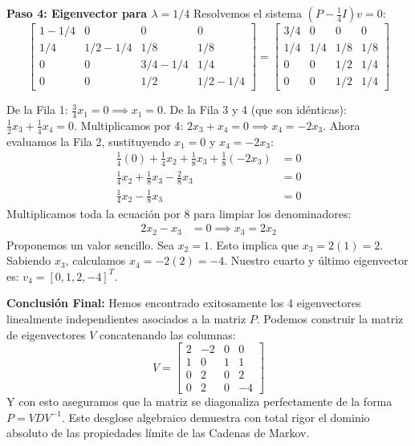 \documentclass[12pt, a4paper]{article}
\begin{document}
\textbf{Paso 4: Eigenvector para $\lambda = 1/4$}
Resolvemos el sistema $(P - \frac{1}{4} I)v = 0$:
$$ \begin{bmatrix} 1-1/4 & 0 & 0 & 0 \\ 1/4 & 1/2-1/4 & 1/8 & 1/8 \\ 0 & 0 & 3/4-1/4 & 1/4 \\ 0 & 0 & 1/2 & 1/2-1/4 \end{bmatrix} = \begin{bmatrix} 3/4 & 0 & 0 & 0 \\ 1/4 & 1/4 & 1/8 & 1/8 \\ 0 & 0 & 1/2 & 1/4 \\ 0 & 0 & 1/2 & 1/4 \end{bmatrix} $$

De la Fila 1: $\frac{3}{4}x_1 = 0 \implies x_1 = 0$.
De la Fila 3 y 4 (que son idénticas): $\frac{1}{2}x_3 + \frac{1}{4}x_4 = 0$. Multiplicamos por 4: $2x_3 + x_4 = 0 \implies x_4 = -2x_3$.
Ahora evaluamos la Fila 2, sustituyendo $x_1=0$ y $x_4 = -2x_3$:
\begin{align*}
    \frac{1}{4}(0) + \frac{1}{4}x_2 + \frac{1}{8}x_3 + \frac{1}{8}(-2x_3) &= 0 \\
    \frac{1}{4}x_2 + \frac{1}{8}x_3 - \frac{2}{8}x_3 &= 0 \\
    \frac{1}{4}x_2 - \frac{1}{8}x_3 &= 0
\end{align*}
Multiplicamos toda la ecuación por 8 para limpiar los denominadores:
\begin{align*}
    2x_2 - x_3 &= 0 \implies x_3 = 2x_2
\end{align*}
Proponemos un valor sencillo. Sea $x_2 = 1$.
Esto implica que $x_3 = 2(1) = 2$.
Sabiendo $x_3$, calculamos $x_4 = -2(2) = -4$.
Nuestro cuarto y último eigenvector es: $v_4 = [0, 1, 2, -4]^T$.

\textbf{Conclusión Final:} Hemos encontrado exitosamente los 4 eigenvectores linealmente independientes asociados a la matriz $P$. Podemos construir la matriz de eigenvectores $V$ concatenando las columnas:
$$ V = \begin{bmatrix} 2 & -2 & 0 & 0 \\ 1 & 0 & 1 & 1 \\ 0 & 2 & 0 & 2 \\ 0 & 2 & 0 & -4 \end{bmatrix} $$
Y con esto aseguramos que la matriz se diagonaliza perfectamente de la forma $P = V D V^{-1}$. Este desglose algebraico demuestra con total rigor el dominio absoluto de las propiedades límite de las Cadenas de Markov.
\end{document}
